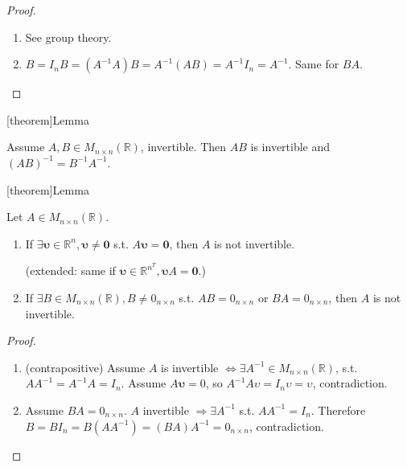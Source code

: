 \documentclass[12pt]{report}
\theoremstyle{definition}
\begin{document}
\begin{proof}
    \,

    \begin{enumerate}[label = (\arabic*)]
        \item See group theory.
        \item $B = I_n B = (A^{-1} A)B = A^{-1} (AB) = A^{-1} I_n = A^{-1}$.
            Same for $BA$.
    \end{enumerate}
    
\end{proof}

[theorem]{Lemma}
\begin{AB = A-1 B-1}
    Assume $A,B \in M_{n \times n}(\mathbb{R})$, invertible.
    Then $AB$ is invertible and ${(AB)}^{-1} = B^{-1}A^{-1}$.
\end{AB = A-1 B-1}

[theorem]{Lemma}
\begin{invertibility}
    Let $A \in M_{n \times n}(\mathbb{R})$.
    \begin{enumerate}[label = (\arabic*)]
        \item If $\exists \mathbf{\upsilon} \in \mathbb{R}^{n}, \mathbf{\upsilon} \neq \mathbf{0}$ 
            s.t. $A\mathbf{\upsilon} = \mathbf{0}$, then $A$ is not invertible.

            (extended: same if $\mathbf{\upsilon} \in \mathbb{R}^{n}^{T}, \mathbf{\upsilon}A = \mathbf{0}$.)
        \item If $\exists B \in M_{n \times n}(\mathbb{R}), B \neq 0_{n \times n}$ s.t.
            $AB = 0_{n \times n}$ or $BA = 0_{n \times n}$, then $A$ is not invertible.
    \end{enumerate}
\end{invertibility}

\begin{proof}
    \,

    \begin{enumerate}[label = (\arabic*)]
        \item (contrapositive) Assume $A$ is invertible $\iff \exists A^{-1} \in M_{n\times n}(\mathbb{R})$,
            s.t. $AA^{-1} = A^{-1}A = I_n$.
            Assume $A\mathbf{\upsilon} = 0$, so 
            $A^{-1}A\upsilon = I_n \upsilon = \upsilon$, contradiction.
        \item Assume $BA = 0_{n\times n}$. $A$ invertible $\Rightarrow{}\exists A^{-1}$
            s.t. $AA^{-1} = I_n$.
            Therefore $B = BI_{n} = B(AA^{-1}) = (BA)A^{-1} = 0_{n\times n}$, contradiction.
    \end{enumerate}
\end{proof}
\end{document}
